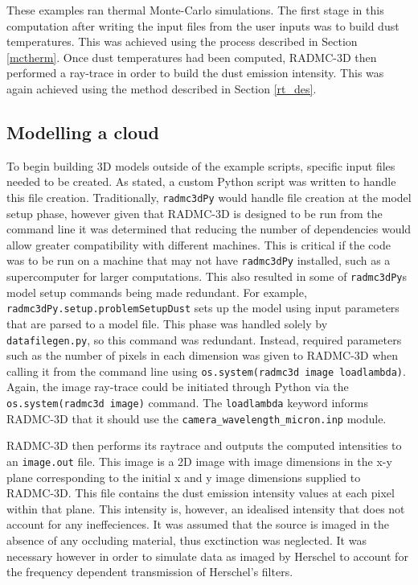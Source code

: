 \documentclass{report}
\begin{document}
These examples ran thermal Monte-Carlo simulations. The first stage in this computation after writing the input files from the user inputs was to build dust temperatures. This was achieved using the process described in Section \ref{mctherm}. Once dust temperatures had been computed, RADMC-3D then performed a ray-trace in order to build the dust emission intensity. This was again achieved using the method described in Section \ref{rt_des}.

\subsection{Modelling a cloud}
To begin building 3D models outside of the example scripts, specific input files needed to be created. As stated, a custom Python script was written to handle this file creation. Traditionally, \texttt{radmc3dPy} would handle file creation at the model setup phase, however given that RADMC-3D is designed to be run from the command line it was determined that reducing the number of dependencies would allow greater compatibility with different machines. This is critical if the code was to be run on a machine that may not have \texttt{radmc3dPy} installed, such as a supercomputer for larger computations. This also resulted in some of \texttt{radmc3dPy\textquotesingle}s model setup commands being made redundant. For example, \texttt{radmc3dPy.setup.problemSetupDust} sets up the model using input parameters that are parsed to a model file. This phase was handled solely by \texttt{datafilegen.py}, so this command was redundant. Instead, required parameters such as the number of pixels in each dimension was given to RADMC-3D when calling it from the command line using \texttt{os.system(radmc3d image loadlambda)}. Again, the image ray-trace could be initiated through Python via the \texttt{os.system(radmc3d image)} command. The \texttt{loadlambda} keyword informs RADMC-3D that it should use the \texttt{camera\_wavelength\_micron.inp} module.

RADMC-3D then performs its raytrace and outputs the computed intensities to an \texttt{image.out} file. This image is a 2D image with image dimensions in the x-y plane corresponding to the initial x and y image dimensions supplied to RADMC-3D. This file contains the dust emission intensity values at each pixel within that plane. This intensity is, however, an idealised intensity that does not account for any ineffeciences. It was assumed that the source is imaged in the absence of any occluding material, thus exctinction was neglected. It was necessary however in order to simulate data as imaged by Herschel to account for the frequency dependent transmission of Herschel's filters.
\end{document}
